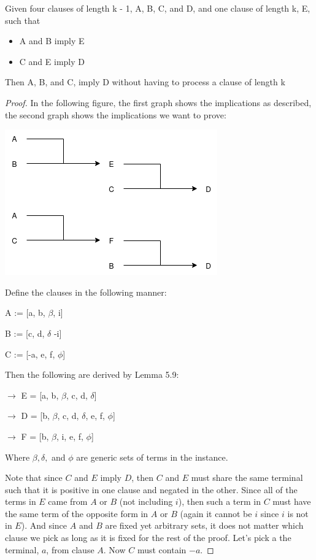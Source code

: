 \documentclass[manuscript]{acmart}
\begin{document}
    \begin{lemma}
        Given four clauses of length k - 1, A, B, C, and D, and one clause of 
        length k, E, such that 
        \begin{itemize}
            \item A and B imply E
            \item C and E imply D
        \end{itemize}
        Then A, B, and C, imply D without having to process a clause of length k
    \end{lemma}
    \begin{proof}
        
        In the following figure, the first graph shows the implications as described, the second
        graph shows the implications we want to prove:
        
        \includegraphics[scale=0.8]{317a}


        Define the clauses in the following manner:

        A := [a, b, $\beta$, i]

        B := [c, d, $\delta$ -i]

        C := [-a, e, f, $\phi$]

        Then the following are derived by Lemma 5.9:
        
        $\rightarrow$ E = [a, b, $\beta$, c, d, $\delta$]

        $\rightarrow$ D = [b, $\beta$, c, d, $\delta$, e, f, $\phi$]

        $\rightarrow$ F = [b, $\beta$, i, e, f, $\phi$]

        Where $\beta, \delta, $ and $\phi$ are generic sets of terms in the instance.

        Note that since $C$ and $E$ imply $D$, then $C$ and $E$ must share the
        same terminal such that it is positive in one clause and negated in the other.
        Since all of the terms in $E$ came from $A$ or $B$ (not including $i$),
        then such a term in $C$ must have the same term of the opposite form in
        $A$ or $B$ (again it cannot be $i$ since $i$ is not in $E$). And since
        $A$ and $B$ are fixed yet arbitrary sets, it does not matter which clause
        we pick as long as it is fixed for the rest of the proof. Let's pick a
        the terminal, $a$, from clause $A$. Now $C$ must contain $-a$.
 

\end{proof}
\end{document}
